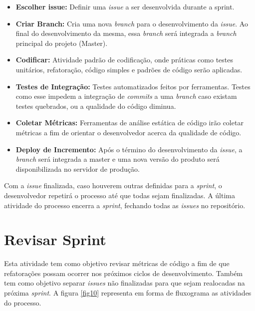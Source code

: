 \begin{itemize}

	\item \textbf{Escolher issue:} Definir uma \textit{issue} a ser desenvolvida durante a sprint.

	\item \textbf{Criar Branch:} Cria uma nova \textit{branch} para o desenvolvimento da \textit{issue}. Ao final do desenvolvimento da mesma, essa \textit{branch} será integrada a \textit{branch} principal do projeto (Master).

	\item \textbf{Codificar:} Atividade padrão de codificação, onde práticas como testes unitários, refatoração, código simples e padrões de código serão aplicadas.

	\item \textbf{Testes de Integração:} Testes automatizados feitos por ferramentas. Testes como esse impedem a integração de \textit{commits} a uma \textit{branch} caso existam testes quebrados, ou a qualidade do código diminua.

	\item \textbf{Coletar Métricas:} Ferramentas de análise estática de código  irão coletar métricas a fim de orientar o desenvolvedor acerca da qualidade de código.

	\item \textbf{Deploy de Incremento:} Após o término do desenvolvimento da \textit{issue}, a \textit{branch} será integrada a master e uma nova versão do produto será disponibilizada no servidor de produção.

\end{itemize}

Com a \textit{issue} finalizada, caso houverem outras definidas para a \textit{sprint}, o desenvolvedor repetirá o processo até que todas sejam finalizadas. A última atividade do processo encerra a \textit{sprint}, fechando todas as \textit{issues} no repositório.

\section{Revisar Sprint}

Esta atividade tem como objetivo revisar métricas de código a fim de que refatorações possam ocorrer nos próximos ciclos de desenvolvimento. Também tem como objetivo separar \textit{issues} não finalizadas para que sejam realocadas na próxima \textit{sprint}. A figura \ref{fig10} representa em forma de fluxograma as atividades do processo.

